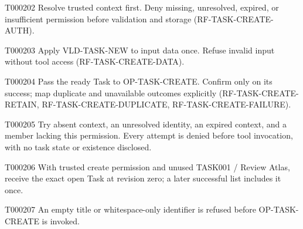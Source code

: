 \documentclass[11pt,a4paper]{article}
\begin{document}
\begin{atlasparagraph}{T000202}
Resolve trusted context first. Deny missing, unresolved, expired, or insufficient permission before validation and storage (RF-TASK-CREATE-AUTH).
\end{atlasparagraph}
\begin{atlasparagraph}{T000203}
Apply VLD-TASK-NEW to input data once. Refuse invalid input without tool access (RF-TASK-CREATE-DATA).
\end{atlasparagraph}
\begin{atlasparagraph}{T000204}
Pass the ready Task to OP-TASK-CREATE. Confirm only on its success; map duplicate and unavailable outcomes explicitly (RF-TASK-CREATE-RETAIN, RF-TASK-CREATE-DUPLICATE, RF-TASK-CREATE-FAILURE).
\end{atlasparagraph}
\par{}
\par{}\hypertarget{AC-TASK-CREATE-AUTH}{}
\begin{atlasparagraph}{T000205}
Try absent context, an unresolved identity, an expired context, and a member lacking this permission. Every attempt is denied before tool invocation, with no task state or existence disclosed.
\end{atlasparagraph}
\par{}\hypertarget{AC-TASK-CREATE-SUCCESS}{}
\begin{atlasparagraph}{T000206}
With trusted create permission and unused TASK001 / Review Atlas, receive the exact open Task at revision zero; a later successful list includes it once.
\end{atlasparagraph}
\par{}\hypertarget{AC-TASK-CREATE-INVALID}{}
\begin{atlasparagraph}{T000207}
An empty title or whitespace-only identifier is refused before OP-TASK-CREATE is invoked.
\end{atlasparagraph}
\end{document}
